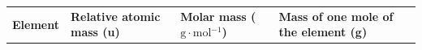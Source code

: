{    %
    
        \begin{center}
      
      \label{m38717*uid11}
      
    \noindent
      \tablelasttail{}
      \begin{xtabular*}{\mytablewidth}[t]{|p{10\mystarwidth}|p{10\mystarwidth}|p{10\mystarwidth}|p{10\mystarwidth}|}\hline
    
    
        
                \textbf{Element}
               &
    
    
        
                \textbf{Relative atomic mass (u)}
               &
    
    
        
                \textbf{Molar mass (\begin{math}\mathrm{g}\ensuremath{\cdot}\mathrm{mol}{}^{-1}\end{math})}
               &
    
    
        
                \textbf{Mass of one mole of the element (g)}
     \tabularnewline{}
    

\end{xtabular*}
\end{center}}
